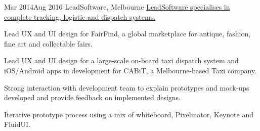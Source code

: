 {Mar 2014}{Aug 2016}
{LeadSoftware, Melbourne}
{\href{http://www.leadsoftware.com.au/}{LeadSoftware specialises in complete tracking, logistic and dispatch systems.}}
{
  \item Lead UX and UI design for FairFind, a global marketplace for antique, fashion, fine art and collectable fairs.
  \item Lead UX and UI design for a large-scale on-board taxi dispatch system and iOS/Android apps in development for CABiT, a Melbourne-based Taxi company.
  \item Strong interaction with development team to explain prototypes and mock-ups developed and provide feedback on implemented designs.
  \item Iterative prototype process using a mix of whiteboard, Pixelmator, Keynote and FluidUI.
}